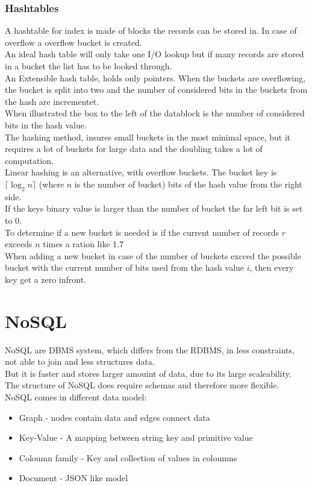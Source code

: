\documentclass[12pt, a4paper]{article}
\begin{document}
			\subsubsection{Hashtables}
				A hashtable for index is made of blocks the records can be stored in. In case of overflow a overflow bucket is created.\\
				An ideal hash table will only take one I/O lookup but if many records are stored in a bucket the list has to be looked through.\\
				An Extensible hash table, holds only pointers. When the buckets are overflowing, the bucket is split into two and the number of considered bits in the buckets from the hash are incrementet.\\
				When illustrated the box to the left of the datablock is the number of considered bits in the hash value.\\
				The hashing method, insures small buckets in the most minimal space, but it requires a lot of buckets for large data and the doubling takes a lot of computation.\\
				Linear hashing is an alternative, with overflow buckets. The bucket key is $\lceil \log_2 n\rceil$ (where $n$ is the number of bucket) bits of the hash value from the right side.\\
				If the keys binary value is larger than the number of bucket the far left bit is set to 0.\\
				To determine if a new bucket is needed is if the current number of records $r$ exceeds $n$ times a ration like 1.7\\
				When adding a new bucket in case of the number of buckets excced the possible bucket with the current number of bits used from the hash value $i$, then every key get a zero infront.\\
	\section{NoSQL}
		NoSQL are DBMS system, which differs from the RDBMS, in less constraints, not able to join and less structures data.\\
		But it is faster and stores larger amouint of data, due to its large scaleability.\\
		The structure of NoSQL does require schemas and therefore more flexible.\\
		NoSQL comes in different data model:
		\begin{itemize}
			\item Graph - nodes contain data and edges connect data
			\item Key-Value - A mapping between string key and primitive value
			\item Coloumn family - Key and collection of values in coloumns
			\item Document - JSON like model
		\end{itemize}
				
			
				
\end{document}

